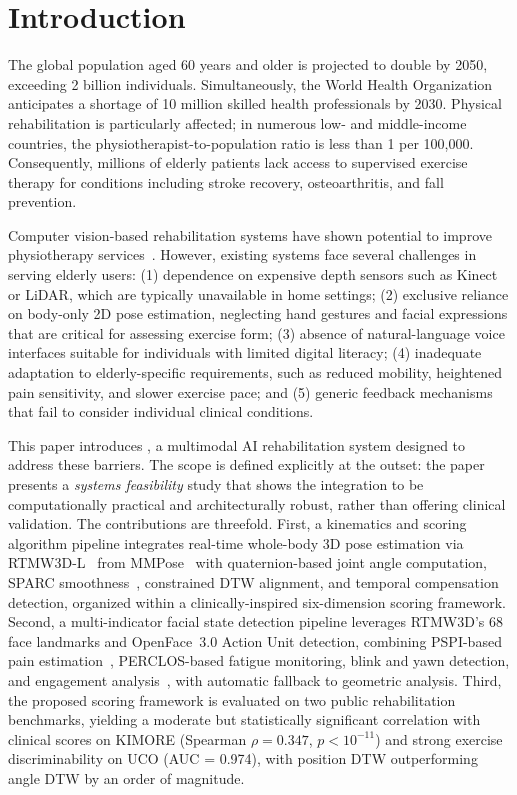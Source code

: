 \section{Introduction}
\label{sec:intro}

The global population aged 60 years and older is projected to double by 2050, exceeding 2 billion individuals. Simultaneously, the World Health Organization anticipates a shortage of 10 million skilled health professionals by 2030. Physical rehabilitation is particularly affected; in numerous low- and middle-income countries, the physiotherapist-to-population ratio is less than 1 per 100,000. Consequently, millions of elderly patients lack access to supervised exercise therapy for conditions including stroke recovery, osteoarthritis, and fall prevention.

Computer vision-based rehabilitation systems have shown potential to improve physiotherapy services~\cite{chen2020pose}. However, existing systems face several challenges in serving elderly users: (1) dependence on expensive depth sensors such as Kinect or LiDAR, which are typically unavailable in home settings; (2) exclusive reliance on body-only 2D pose estimation, neglecting hand gestures and facial expressions that are critical for assessing exercise form; (3) absence of natural-language voice interfaces suitable for individuals with limited digital literacy; (4) inadequate adaptation to elderly-specific requirements, such as reduced mobility, heightened pain sensitivity, and slower exercise pace; and (5) generic feedback mechanisms that fail to consider individual clinical conditions.

This paper introduces \system{}, a multimodal AI rehabilitation system designed to address these barriers. The scope is defined explicitly at the outset: the paper presents a \emph{systems feasibility} study that shows the integration to be computationally practical and architecturally robust, rather than offering clinical validation. The contributions are threefold. First, a kinematics and scoring algorithm pipeline integrates real-time whole-body 3D pose estimation via RTMW3D-L~\cite{jiang2024rtmw} from MMPose~\cite{contributors2020openmmlab} with quaternion-based joint angle computation, SPARC smoothness~\cite{Scholp2021}, constrained DTW alignment, and temporal compensation detection, organized within a clinically-inspired six-dimension scoring framework. Second, a multi-indicator facial state detection pipeline leverages RTMW3D's 68 face landmarks and OpenFace~3.0 Action Unit detection, combining PSPI-based pain estimation~\cite{prkachin2008structure}, PERCLOS-based fatigue monitoring, blink and yawn detection, and engagement analysis~\cite{6786307}, with automatic fallback to geometric analysis. Third, the proposed scoring framework is evaluated on two public rehabilitation benchmarks, yielding a moderate but statistically significant correlation with clinical scores on KIMORE (Spearman $\rho = 0.347$, $p < 10^{-11}$) and strong exercise discriminability on UCO (AUC = 0.974), with position DTW outperforming angle DTW by an order of magnitude.

